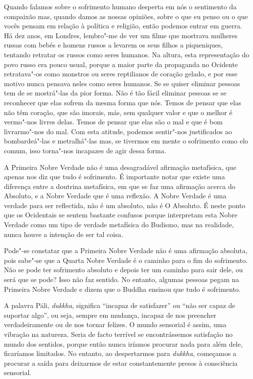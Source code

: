 Quando falamos sobre o sofrimento humano desperta em nós o sentimento da
compaixão mas, quando damos as nossas opiniões, sobre o que eu penso ou o que
vocês pensam em relação à política e religião, então podemos entrar em guerra.
Há dez anos, em Londres, lembro"-me de ver um filme que mostrava mulheres russas
com bebés e homens russos a levarem os seus filhos a piqueniques, tentando
retratar os russos como seres humanos. Na altura, esta representação do povo
russo era pouco usual, porque a maior parte da propaganda no Ocidente
retratava"-os como monstros ou seres reptilianos de coração gelado, e por esse
motivo nunca pensava neles como seres humanos. Se se quiser eliminar pessoas tem
de se mostrá"-las da pior forma. Não é tão fácil eliminar pessoas se se reconhecer que
elas sofrem da mesma forma que nós. Temos de pensar que elas não têm coração,
que são imorais, más, sem qualquer valor e que o melhor é vermo"-nos livres
delas. Temos de pensar que elas são o mal e que é bom livrarmo"-nos do mal. Com
esta atitude, podemos sentir"-nos justificados ao bombardeá"-las e metralhá"-las
mas, se tivermos em mente o sofrimento como elo comum, isso torna"-nos incapazes
de agir dessa forma.

A Primeira Nobre Verdade não é uma desagradável afirmação metafísica, que apenas
nos diz que tudo é sofrimento. É importante notar que existe uma diferença entre
a doutrina metafísica, em que se faz uma afirmação acerca do Absoluto, e a Nobre
Verdade que é uma reflexão. A Nobre Verdade é uma verdade para ser reflectida,
não é um absoluto, não é O Absoluto. É neste ponto que os Ocidentais se sentem
bastante confusos porque interpretam esta Nobre Verdade como um tipo de verdade
metafísica do Budismo, mas na realidade, nunca houve a intenção de ser tal
coisa.

Pode"-se constatar que a Primeira Nobre Verdade não é uma afirmação absoluta,
pois sabe"-se que a Quarta Nobre Verdade é o caminho para o fim do sofrimento.
Não se pode ter sofrimento absoluto e depois ter um caminho para sair dele, ou
será que se pode? Isso não faz sentido. No entanto, algumas pessoas pegam na
Primeira Nobre Verdade e dizem que o Buddha ensinou que tudo é sofrimento.

A palavra Pāli, \emph{dukkha}, significa “incapaz de satisfazer” ou “não ser
capaz de suportar algo”, ou seja, sempre em mudança, incapaz de nos preencher
verdadeiramente ou de nos tornar felizes. O mundo sensorial é assim, uma
vibração na natureza. Seria de facto terrível se encontrássemos satisfação no
mundo dos sentidos, porque então nunca iríamos procurar nada para além dele, ficaríamos
limitados. No entanto, ao despertarmos para \emph{dukkha}, começamos a procurar
a saída para deixarmos de estar constantemente presos à consciência sensorial.

